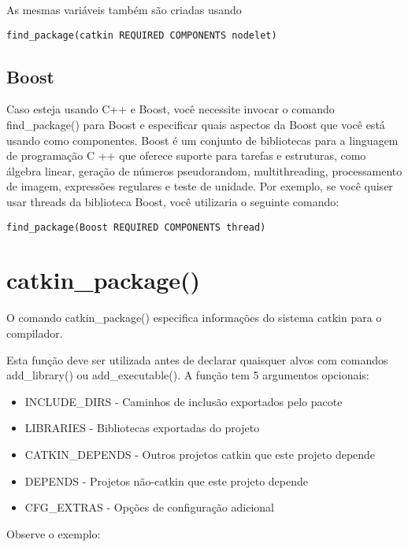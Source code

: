 As mesmas variáveis também são criadas usando

\begin{verbatim} 
find_package(catkin REQUIRED COMPONENTS nodelet)
\end{verbatim}

\subsection{Boost}

Caso esteja usando C++ e Boost, você necessite invocar o comando find\_package() para Boost e especificar quais aspectos da Boost que você está usando como componentes. Boost é um conjunto de bibliotecas para a linguagem de programação C ++ que oferece suporte para tarefas e estruturas, como álgebra linear, geração de números pseudorandom, multithreading, processamento de imagem, expressões regulares e teste de unidade. Por exemplo, se você quiser usar threads da biblioteca Boost, você utilizaria o seguinte comando:

\begin{verbatim} 
find_package(Boost REQUIRED COMPONENTS thread)
\end{verbatim}

\section{catkin\_package()}

O comando catkin\_package() especifica informações do sistema catkin para o compilador.

Esta função deve ser utilizada antes de declarar quaisquer alvos com comandos add\_library() ou add\_executable(). A função tem 5 argumentos opcionais:

\begin{itemize}
	\setlength{\itemsep}{1pt}
	\setlength{\parskip}{0pt}
	\setlength{\parsep}{0pt}
	\item[]INCLUDE\_DIRS - Caminhos de inclusão exportados pelo pacote
	\item[]LIBRARIES - Bibliotecas exportadas do projeto
	\item[]CATKIN\_DEPENDS - Outros projetos catkin que este projeto depende
	\item[]DEPENDS - Projetos não-catkin que este projeto depende
	\item[]CFG\_EXTRAS - Opções de configuração adicional
\end{itemize}

Observe o exemplo:

